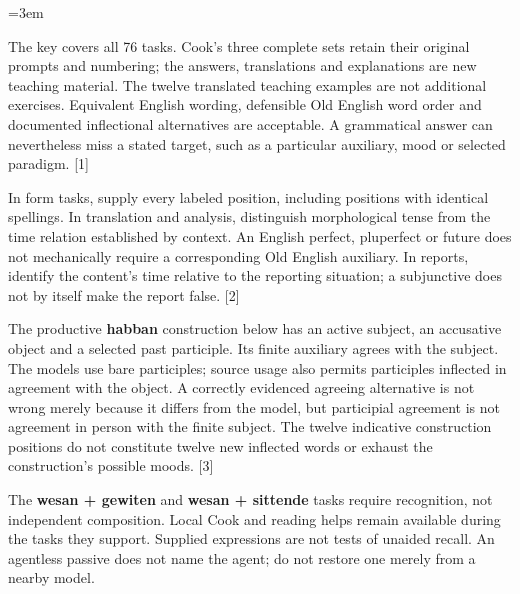 \BookRecto
\begingroup
\renewcommand{\runningtitle}{Unit 12. Answer key}
\emergencystretch=3em
\newcommand{\itempara}[2]{\par\addvspace{3pt}\noindent\hangindent=1.8em\hangafter=1\makebox[1.8em][l]{#1.}#2\par}
\newcommand{\reserve}[1]{\par\penalty-100\begingroup\dimen0=\pagegoal\advance\dimen0 by-\pagetotal\ifdim\dimen0<#1\newpage\fi\endgroup}

\raggedright
{}

The key covers all 76 tasks. Cook's three complete sets retain their original prompts and numbering; the answers, translations and explanations are new teaching material. The twelve translated teaching examples are not additional exercises. Equivalent English wording, defensible Old English word order and documented inflectional alternatives are acceptable. A grammatical answer can nevertheless miss a stated target, such as a particular auxiliary, mood or selected paradigm. [1]

In form tasks, supply every labeled position, including positions with identical spellings. In translation and analysis, distinguish morphological tense from the time relation established by context. An English perfect, pluperfect or future does not mechanically require a corresponding Old English auxiliary. In reports, identify the content's time relative to the reporting situation; a subjunctive does not by itself make the report false. [2]

The productive \textbf{habban} construction below has an active subject, an accusative object and a selected past participle. Its finite auxiliary agrees with the subject. The models use bare participles; source usage also permits participles inflected in agreement with the object. A correctly evidenced agreeing alternative is not wrong merely because it differs from the model, but participial agreement is not agreement in person with the finite subject. The twelve indicative construction positions do not constitute twelve new inflected words or exhaust the construction's possible moods. [3]

The \textbf{wesan + gewiten} and \textbf{wesan + sittende} tasks require recognition, not independent composition. Local Cook and reading helps remain available during the tasks they support. Supplied expressions are not tests of unaided recall. An agentless passive does not name the agent; do not restore one merely from a nearby model.

